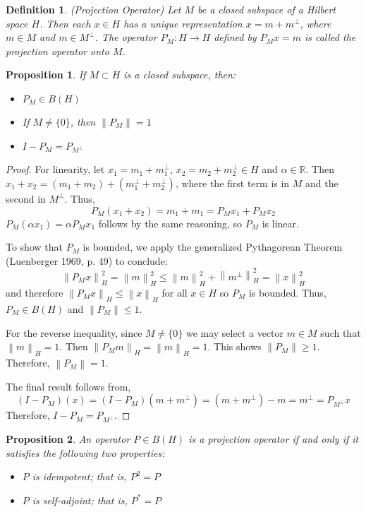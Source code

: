 \documentclass[12pt]{article}
\newcommand*{\norm}[1]{\left\lVert#1\right\rVert}
\newtheorem{definition}{Definition}
\newtheorem{prop}{Proposition}
\begin{document}
\begin{definition} 
(Projection Operator) Let $M$ be a closed subspace of a Hilbert space $H$. Then each $x \in H$ has a unique
representation $x = m + m^\perp$, where $m \in M$ and $m \in M^\perp$. The operator $P_M: H \to H$ defined 
by $P_Mx = m$ is called the projection operator onto $M$. 
\end{definition}

\begin{prop} \label{projection_properties}
If $M \subset H$ is a closed subspace, then: 
\begin{itemize} 
\item $P_M \in B(H)$
\item If $M \neq \{0\}$, then $\norm{P_M} = 1$
\item $I - P_M = P_{M^\perp}$
\end{itemize} 
\end{prop}

\begin{proof} 
For linearity, let $x_1 = m_1 + m_1^\perp$, $x_2 = m_2 + m_2^\perp \in H$ and $\alpha \in \mathbb{R}$. Then 
$x_1 + x_2 = (m_1 + m_2) + (m_1^\perp + m_2^\perp)$, where the first term is in 
$M$ and the second in $M^\perp$. Thus, \[P_M (x_1 + x_2) = m_1 + m_1 = P_M x_1 + P_M x_2\]
$P_M (\alpha x_1) = \alpha P_M x_1$ follows by the same reasoning, so $P_M$ is linear. 

To show that $P_M$ is bounded, we apply the generalized Pythagorean Theorem (Luenberger 1969, p. 49) to conclude: 
\[\norm{P_M x}_H^2 = \norm{m}_H^2 \leq \norm{m}_H^2 + \norm{m^\perp}_H^2 = \norm{x}_H^2\]
and therefore $\norm{P_M x}_H \leq \norm{x}_H$ for all $x \in H$ so $P_M$ is bounded. Thus, $P_M \in B(H)$
and $\norm{P_M} \leq 1$. 

For the reverse inequality, since $M \neq \{0\}$ we may select a vector $m \in M$ such that $\norm{m}_H = 1$.
Then $\norm{P_M m}_H = \norm{m}_H = 1$. This shows $\norm{P_M} \geq 1$. Therefore, $\norm{P_M} = 1$. 

The final result follows from, \[(I - P_M)(x) = (I - P_M)(m + m^\perp) = (m + m^\perp) - m = m^\perp = P_{M^\perp}x\]
Therefore, $I - P_M = P_{M^\perp}$. 
\end{proof} 

\begin{prop} 
An operator $P \in B(H)$ is a projection operator if and only if it satisfies the following two properties: 
\begin{itemize} 
\item $P$ is idempotent; that is, $P^2 = P$
\item $P$ is self-adjoint; that is, $P^* = P$
\end{itemize} 
\end{prop} 
\end{document}
